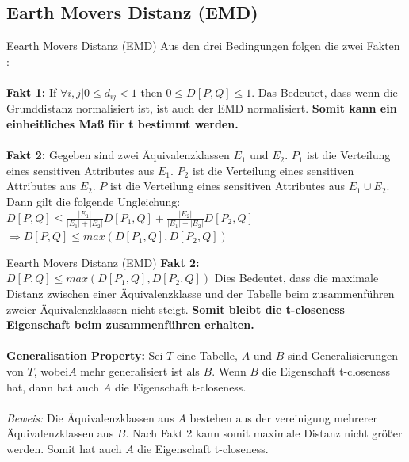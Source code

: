 \subsection{Earth Movers Distanz (EMD)}
\begin{frame}{Eearth Movers Distanz (EMD)}
	Aus den drei Bedingungen folgen die zwei Fakten \cite{Li2007t-closseness}:\\
	\ \\
	\textbf{Fakt 1:} If $\forall i,j | 0 \le d_{ij} < 1$ then $0 \le D[P,Q]  \le 1$. 
	Das Bedeutet, dass wenn die Grunddistanz normalisiert ist, ist auch der EMD normalisiert. \textbf{Somit kann ein einheitliches Maß für t bestimmt werden.}\\
	\ \\
	\textbf{Fakt 2:} Gegeben sind zwei Äquivalenzklassen $E_1$ und $E_2$.
	$P_1$ ist die Verteilung eines sensitiven Attributes aus $E_1$.
	$P_2$ ist die Verteilung eines sensitiven Attributes aus $E_2$.
	$P$ ist die Verteilung eines sensitiven Attributes aus $E_1 \cup E_2$. Dann gilt die folgende Ungleichung: \\
	$D[P,Q] \le \frac{|E_1|}{|E_1|+|E_2|}D[P_1,Q] + \frac{|E_2|}{|E_1|+|E_2|}D[P_2,Q]$\\
	$\Rightarrow D[P,Q] \le max(D[P_1,Q], D[P_2,Q])$ 
\end{frame}

\begin{frame}{Eearth Movers Distanz (EMD)}
	\textbf{Fakt 2:} $D[P,Q] \le max(D[P_1,Q], D[P_2,Q])$ 
	Dies Bedeutet, dass die maximale Distanz zwischen einer Äquivalenzklasse und der Tabelle beim zusammenführen zweier Äquivalenzklassen nicht steigt. \textbf{Somit bleibt die t-closeness Eigenschaft beim zusammenführen erhalten.} \\ 
	\ \\
	\textbf{Generalisation Property:} Sei $T$ eine Tabelle, $A$ und $B$ sind Generalisierungen von $T$, wobei$A$ mehr generalisiert ist als $B$. Wenn $B$ die Eigenschaft t-closeness hat, dann hat auch $A$ die Eigenschaft t-closeness.\\
	\ \\
	\textit{Beweis:} Die Äquivalenzklassen aus $A$ bestehen aus der vereinigung mehrerer Äquivalenzklassen aus $B$. Nach Fakt 2 kann somit maximale Distanz nicht größer werden. Somit hat auch $A$ die Eigenschaft t-closeness.  
\end{frame}

